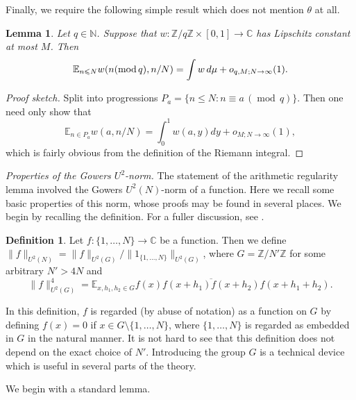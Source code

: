 \documentclass[10pt,reqno]{amsart}
\newtheorem{lemma}[theorem]{Lemma}
\theoremstyle{definition}
\newtheorem{definition}[theorem]{Definition}
\theoremstyle{remark}
\newcommand{\md}[1]{\ensuremath{\,(\operatorname{mod}\, #1)}}
\newcommand{\mdlem}[1]{\ensuremath{(\mbox{\textup{mod}}\, #1)}}
\renewcommand{\leq}{\leqslant}
\def\C{\mathbb{C}}
\def\Z{\mathbb{Z}}
\def\E{\mathbb{E}}
\def\N{\mathbb{N}}
\numberwithin{equation}{section}
\begin{document}
Finally, we require the following simple result which does not mention $\theta$ at all.

\begin{lemma}\label{lem-a7} Let $q \in \N$. Suppose that $w : \Z/q\Z \times [0,1] \rightarrow \C$ has Lipschitz constant at most $M$. Then 
\[ \E_{n \leq N} w(n \mdlem{q}, n/N) = \int w\, d\mu + o_{q,M;N \rightarrow \infty}(1).\]
\end{lemma}
\begin{proof}[Proof sketch] Split into progressions $P_a = \{n \leq N: n \equiv a \md{q}\}$. Then one need only show that
\[  \E_{n \in P_a} w(a, n/N) = \int_0^1 w(a,y) dy + o_{M; N \rightarrow \infty}(1), \]
which is fairly obvious from the definition of the Riemann integral.
\end{proof}

\emph{Properties of the Gowers $U^2$-norm.} The statement of the arithmetic regularity lemma involved the Gowers $U^2(N)$-norm of a function. Here we recall some basic properties of this norm, whose proofs may be found in several places. We begin by recalling the definition. For a fuller discussion, see \cite{green-tao-arithregularity}. 

\begin{definition}
Let $f : \{1,\dots, N\} \rightarrow \C$ be a function. Then we define $\| f \|_{U^2(N)} = \| f \|_{U^2(G)}/\| 1_{\{1,\dots,N\}} \|_{U^2(G)}$, where $G = \Z/N'\Z$ for some arbitrary $N' > 4N$ and
\[ \| f \|_{U^2(G)}^4 = \E_{x, h_1, h_2 \in G} f(x) \overline{f(x+h_1) f(x+h_2)} f(x + h_1 + h_2).\]
\end{definition}
In this definition, $f$ is regarded (by abuse of notation) as a function on $G$ by defining $f(x) = 0$ if $x \in G \setminus \{1,\dots, N\}$, where $\{1,\dots, N\}$ is regarded as embedded in $G$ in the natural manner. It is not hard to see that this definition does not depend on the exact choice of $N'$. Introducing the group $G$ is a technical device which is useful in several parts of the theory. 

We begin with a standard lemma. 
\end{document}
